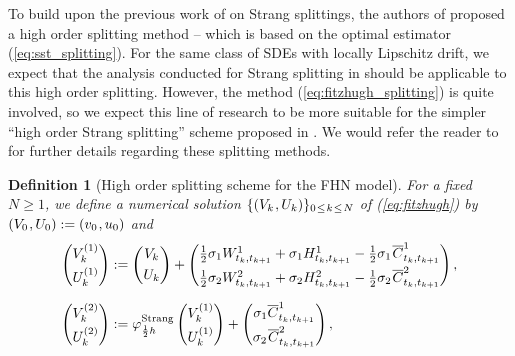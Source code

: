 \documentclass[sn-mathphys-num]{sn-jnl}%
\newtheorem{definition}{Definition}%
\newcommand{\m}{\hspace{0.25mm}}
\begin{document}
To build upon the previous work of \cite{buckwar2022splitting} on Strang splittings, the authors of \cite{foster2024splitting} proposed a high order splitting method -- which is based on the optimal estimator (\ref{eq:sst_splitting}).
For the same class of SDEs with locally Lipschitz drift, we expect that the analysis conducted for Strang splitting in \cite{buckwar2022splitting} should be applicable to this high order splitting.
However, the method (\ref{eq:fitzhugh_splitting}) is quite involved, so we expect this line of research to be more suitable for the simpler ``high order Strang splitting'' scheme proposed in \cite{foster2024splitting}.
We would refer the reader to \cite{foster2024splitting} for further details regarding these splitting methods.
\medbreak
\begin{definition}[High order splitting scheme for the FHN model]
For a fixed $N\geq 1$, we define a numerical solution $\{(V_k\m, U_k)\}_{0\m\leq\m k\m\leq\m N}$ of (\ref{eq:fitzhugh}) by $(V_0\m, U_0) := (v_0\m, u_0)$ and\vspace*{-1mm}
\begin{align}
\begin{pmatrix}V_k^{(1)}\\[3pt] U_k^{(1)}\end{pmatrix} & := \begin{pmatrix}V_k\\[3pt] U_k\end{pmatrix} + \begin{pmatrix}\frac{1}{2}\sigma_1 W_{t_k, t_{k+1}}^{1} + \sigma_1 H_{t_k, t_{k+1}}^{1} - \frac{1}{2} \sigma_1\m\overline{C}_{t_k, t_{k+1}}^{1}\\[3pt] \frac{1}{2}\sigma_2 W_{t_k, t_{k+1}}^{2} + \sigma_2 H_{t_k, t_{k+1}}^{2} - \frac{1}{2}\sigma_2\m \overline{C}_{t_k, t_{k+1}}^{2}\end{pmatrix},\nonumber\\[6pt]
\begin{pmatrix}V_k^{(2)}\\[3pt] U_k^{(2)}\end{pmatrix} & := \varphi_{\frac{1}{2}h}^{\text{Strang}}\begin{pmatrix}V_k^{(1)}\\[3pt] U_k^{(1)}\end{pmatrix} + \begin{pmatrix} \sigma_1\overline{C}_{t_k, t_{k+1}}^{1}\\[3pt] \sigma_2\m\overline{C}_{t_k, t_{k+1}}^{2}\end{pmatrix},\nonumber\\[6pt]

\end{align}
\end{definition}
\end{document}
